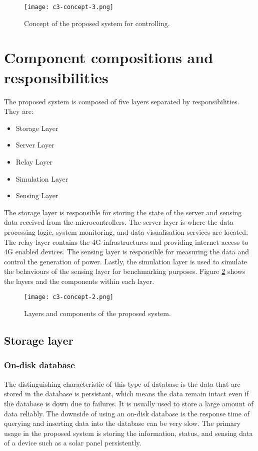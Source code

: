 \documentclass[../thesis.tex]{subfiles}
\begin{document}
\begin{figure}[!ht]
  \texttt{[image: c3-concept-3.png]}
  \caption{Concept of the proposed system for controlling.}
  \label{fig:concept3}
\end{figure}


\newpage
\section{Component compositions and responsibilities}
\label{sec:composition}

The proposed system is composed of five layers separated by responsibilities. They are:

\begin{itemize}
	\item Storage Layer
	\item Server Layer
	\item Relay Layer
	\item Simulation Layer
	\item Sensing Layer
\end{itemize}

The storage layer is responsible for storing the state of the server and sensing data received from the microcontrollers. The server layer is where the data processing logic, system monitoring, and data visualisation services are located. The relay layer contains the 4G infrastructures and providing internet access to 4G enabled devices. The sensing layer is responsible for measuring the data and control the generation of power. Lastly, the simulation layer is used to simulate the behaviours of the sensing layer for benchmarking purposes. Figure \ref{fig:concept2} shows the layers and the components within each layer.


\begin{figure}[!ht]
  \texttt{[image: c3-concept-2.png]}
  \caption{Layers and components of the proposed system.}
  \label{fig:concept2}
\end{figure}


\subsection{Storage layer}

\subsubsection{On-disk database}

The distinguishing characteristic of this type of database is the data that are stored in the database is persistant, which means the data remain intact even if the database is down due to failures. It is usually used to store a large amount of data reliably. The downside of using an on-disk database is the response time of querying and inserting data into the database can be very slow. The primary usage in the proposed system is storing the information, status, and sensing data of a device such as a solar panel persistently. 
\end{document}
